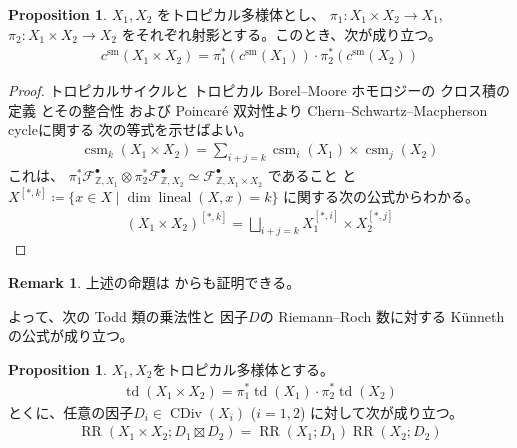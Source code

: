 \documentclass[a4paper,dvipdfmx,reqno,12pt]{amsart}
\theoremstyle{definition}
\newtheorem{proposition}[theorem]{Proposition}
\newtheorem{remark}[theorem]{Remark}
\newcommand{\deq}{\coloneqq}
\newcommand{\opn}[1]{\operatorname{#1}}
\numberwithin{equation}{section}
\begin{document}
\begin{proposition}
$X_1,X_2$ をトロピカル多様体とし、
$\pi_1\colon X_1\times X_2 \to X_1$, 
$\pi_2\colon X_1\times X_2 \to X_2$
をそれぞれ射影とする。このとき、次が成り立つ。
\begin{align}
c^{\mathrm{sm}}(X_1\times X_2)=
\pi^{*}_1(c^{\mathrm{sm}}(X_1))\cdot 
\pi^{*}_2(c^{\mathrm{sm}}(X_2))
\end{align}

\end{proposition}

\begin{proof}
トロピカルサイクルと
トロピカル
Borel--Moore ホモロジーの
クロス積の定義
\cite[Definition 3.7, 
Definition 4.15]{gross2019sheaftheoretic}
とその整合性
\cite[Proposition 5.9]{gross2019sheaftheoretic}
および Poincar\'e 双対性より
Chern--Schwartz--Macpherson cycleに関する
次の等式を示せばよい。
\begin{align}
\opn{csm}_k(X_1\times X_2)=\sum_{i+j=k}
\opn{csm}_{i}(X_1)\times \opn{csm}_{j}(X_2)
\end{align}
これは、
$\pi_1^{*}\mathcal{F}^{\bullet}_{\mathbb{Z},X_1}\otimes
\pi_2^{*}\mathcal{F}^{\bullet}_{\mathbb{Z},X_2}
\simeq \mathcal{F}^{\bullet}_{\mathbb{Z},X_1\times X_2}$
であること\cite[Lemma 4.14]{gross2019sheaftheoretic}
と
$X^{[*,k]}\deq \{x\in X\mid \dim \opn{lineal}(X,x)=k\}$
に関する次の公式からわかる。
\begin{align}
(X_1\times X_2)^{[*,k]}=\bigsqcup_{i+j=k}
X_1^{[*,i]}\times X_2^{[*,j]}
\end{align}

\end{proof}

\begin{remark}上述の命題は
\cite[Proposition 5.1]{demedrano2023chern}
からも証明できる。
\end{remark}

よって、次の Todd 類の乗法性と
因子$D$の Riemann--Roch 数に対する
 K\"unneth の公式が成り立つ。

\begin{proposition}
$X_1,X_2$をトロピカル多様体とする。
\begin{align}
\opn{td}(X_1\times X_2)=\pi_{1}^{*}\opn{td}(X_1)\cdot 
\pi_{2}^{*}\opn{td}(X_2)
\end{align}
とくに、任意の因子$D_i\in \opn{CDiv}(X_i)$ ($i=1,2$)
に対して次が成り立つ。
\begin{align}
\opn{RR}(X_1\times X_2;D_1\boxtimes D_2)
=\opn{RR}(X_1;D_1)\opn{RR}(X_2;D_2)
\end{align}

\end{proposition}
\end{document}
